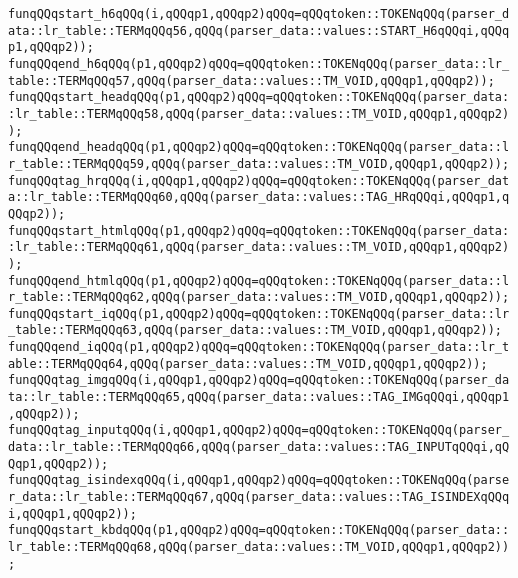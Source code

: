 \verb|funqQQqstart_h6qQQq(i,qQQqp1,qQQqp2)qQQq=qQQqtoken::TOKENqQQq(parser_data::lr_table::TERMqQQq56,qQQq(parser_data::values::START_H6qQQqi,qQQqp1,qQQqp2));|\newline
\verb|funqQQqend_h6qQQq(p1,qQQqp2)qQQq=qQQqtoken::TOKENqQQq(parser_data::lr_table::TERMqQQq57,qQQq(parser_data::values::TM_VOID,qQQqp1,qQQqp2));|\newline
\verb|funqQQqstart_headqQQq(p1,qQQqp2)qQQq=qQQqtoken::TOKENqQQq(parser_data::lr_table::TERMqQQq58,qQQq(parser_data::values::TM_VOID,qQQqp1,qQQqp2));|\newline
\verb|funqQQqend_headqQQq(p1,qQQqp2)qQQq=qQQqtoken::TOKENqQQq(parser_data::lr_table::TERMqQQq59,qQQq(parser_data::values::TM_VOID,qQQqp1,qQQqp2));|\newline
\verb|funqQQqtag_hrqQQq(i,qQQqp1,qQQqp2)qQQq=qQQqtoken::TOKENqQQq(parser_data::lr_table::TERMqQQq60,qQQq(parser_data::values::TAG_HRqQQqi,qQQqp1,qQQqp2));|\newline
\verb|funqQQqstart_htmlqQQq(p1,qQQqp2)qQQq=qQQqtoken::TOKENqQQq(parser_data::lr_table::TERMqQQq61,qQQq(parser_data::values::TM_VOID,qQQqp1,qQQqp2));|\newline
\verb|funqQQqend_htmlqQQq(p1,qQQqp2)qQQq=qQQqtoken::TOKENqQQq(parser_data::lr_table::TERMqQQq62,qQQq(parser_data::values::TM_VOID,qQQqp1,qQQqp2));|\newline
\verb|funqQQqstart_iqQQq(p1,qQQqp2)qQQq=qQQqtoken::TOKENqQQq(parser_data::lr_table::TERMqQQq63,qQQq(parser_data::values::TM_VOID,qQQqp1,qQQqp2));|\newline
\verb|funqQQqend_iqQQq(p1,qQQqp2)qQQq=qQQqtoken::TOKENqQQq(parser_data::lr_table::TERMqQQq64,qQQq(parser_data::values::TM_VOID,qQQqp1,qQQqp2));|\newline
\verb|funqQQqtag_imgqQQq(i,qQQqp1,qQQqp2)qQQq=qQQqtoken::TOKENqQQq(parser_data::lr_table::TERMqQQq65,qQQq(parser_data::values::TAG_IMGqQQqi,qQQqp1,qQQqp2));|\newline
\verb|funqQQqtag_inputqQQq(i,qQQqp1,qQQqp2)qQQq=qQQqtoken::TOKENqQQq(parser_data::lr_table::TERMqQQq66,qQQq(parser_data::values::TAG_INPUTqQQqi,qQQqp1,qQQqp2));|\newline
\verb|funqQQqtag_isindexqQQq(i,qQQqp1,qQQqp2)qQQq=qQQqtoken::TOKENqQQq(parser_data::lr_table::TERMqQQq67,qQQq(parser_data::values::TAG_ISINDEXqQQqi,qQQqp1,qQQqp2));|\newline
\verb|funqQQqstart_kbdqQQq(p1,qQQqp2)qQQq=qQQqtoken::TOKENqQQq(parser_data::lr_table::TERMqQQq68,qQQq(parser_data::values::TM_VOID,qQQqp1,qQQqp2));|\newline
